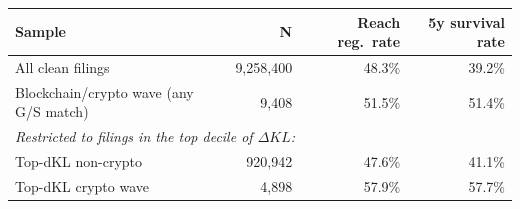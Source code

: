 \begin{tabular}{lrrr}
\toprule
Sample & N & Reach reg.\ rate & 5y survival rate \\
\midrule
All clean filings & 9,258,400 & 48.3\% & 39.2\% \\
Blockchain/crypto wave (any G/S match) & 9,408 & 51.5\% & 51.4\% \\
\midrule
\multicolumn{4}{l}{\textit{Restricted to filings in the top decile of $\Delta KL$:}} \\
\midrule
Top-dKL non-crypto & 920,942 & 47.6\% & 41.1\% \\
Top-dKL crypto wave & 4,898 & 57.9\% & 57.7\% \\
\bottomrule
\end{tabular}
